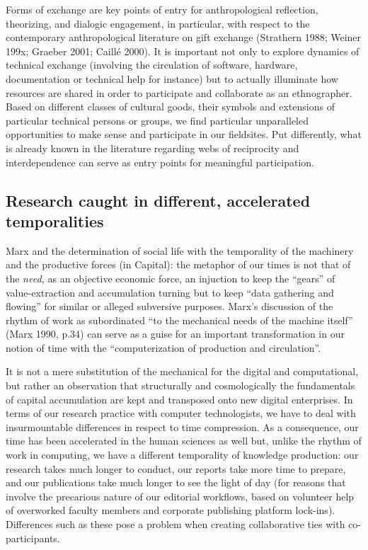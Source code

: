 \documentclass[10pt,letter,oneside]{scrartcl}
\begin{document}
Forms of exchange are key points of entry for anthropological reflection,
theorizing, and dialogic engagement, in particular, with respect to the
contemporary anthropological literature on gift exchange (Strathern 1988;
Weiner 199x; Graeber 2001; Caillé 2000). It is important not only to 
explore dynamics of technical exchange (involving the circulation of 
software, hardware, documentation or technical help for instance) but 
to actually illuminate how resources are shared in order to participate 
and collaborate as an ethnographer. Based on different classes of 
cultural goods, their symbols and extensions of particular technical 
persons or groups, we find particular unparalleled opportunities to 
make sense and participate in our fieldsites. Put differently, what is
already known in the literature regarding webs of reciprocity and
interdependence can serve as entry points for meaningful participation.


\subsection{Research caught in different, accelerated
    temporalities} 

Marx and the determination of social life with the temporality 
of the machinery and the productive forces (in Capital):
the metaphor of our times is not that of the \emph{need,} as an
objective economic force, an injuction to keep the ``gears'' of
value-extraction and accumulation turning but to keep ``data
gathering and flowing'' for similar or alleged subversive purposes. 
Marx's discussion of the rhythm of work as subordinated ``to the 
mechanical needs of the machine itself'' (Marx 1990, p.34) can serve 
as a guise for an important transformation in our notion of time with
the ``computerization of production and circulation''. 

It is not a mere substitution of the mechanical for the digital and
computational, but rather an observation that structurally and
cosmologically the fundamentals of capital accumulation are kept and
transposed onto new digital enterprises.  In terms of our research
practice with computer technologists, we have to deal with insurmountable 
differences in respect to time compression. As a consequence, our time has
been accelerated in the human sciences as well but, unlike the rhythm of 
work in computing, we have a different temporality of knowledge production: 
our research takes much longer to conduct, our reports take more time to 
prepare, and our publications take much longer to see the light of day 
(for reasons that involve the precarious nature of our editorial workflows, 
based on volunteer help of overworked faculty members and corporate 
publishing platform lock-ins). Differences such as these pose a problem when 
creating collaborative ties with co-participants.
\end{document}
